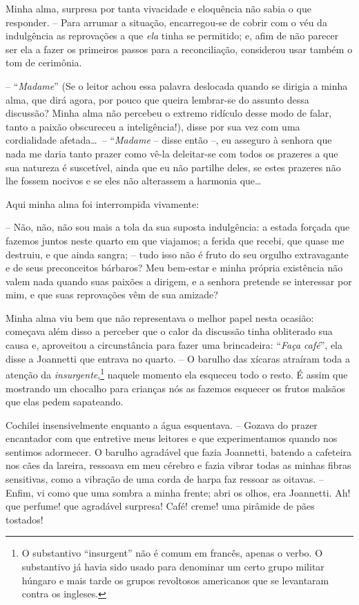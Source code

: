  Minha alma, surpresa por tanta vivacidade e eloquência não sabia o que
responder. -- Para arrumar a situação, encarregou-se de cobrir com o
véu da indulgência as reprovações a que \textit{ela} tinha se
permitido; e, afim de não parecer ser ela a fazer os primeiros passos
para a reconciliação, considerou usar também o tom de cerimônia.

 -- ``\textit{Madame}'' (Se o leitor achou essa palavra deslocada quando
se dirigia a minha alma, que dirá agora, por pouco que queira
lembrar-se do assunto dessa discussão? Minha alma não percebeu o
extremo ridículo desse modo de falar, tanto a paixão obscureceu a
inteligência!), disse por sua vez com uma cordialidade afetada\ldots\ --
``\textit{Madame} -- disse então --, eu asseguro à senhora que nada me daria
tanto prazer como vê-la deleitar-se com todos os prazeres a que sua
natureza é suscetível, ainda que eu não partilhe deles, se estes
prazeres não lhe fossem nocivos e se eles não alterassem a harmonia que\ldots

Aqui minha alma foi interrompida vivamente: 

-- Não, não, não sou mais a tola da sua suposta indulgência: a estada
forçada que fazemos juntos neste quarto em que viajamos; a ferida que
recebi, que quase me destruiu, e que ainda sangra; -- tudo isso não é
fruto do seu orgulho extravagante e de seus preconceitos bárbaros? Meu
bem-estar e minha própria existência não valem nada quando suas paixões
a dirigem, e a senhora pretende se interessar por mim, e que suas
reprovações vêm de sua amizade?

 Minha alma viu bem que não representava o melhor papel nesta
ocasião:  começava além disso a perceber que o calor da discussão tinha
obliterado sua causa e, aproveitou a circunstância para fazer uma
brincadeira: ``\textit{Faça café}'', ela disse a Joannetti que entrava no
quarto. -- O barulho das xícaras atraíram toda a atenção da
\textit{insurgente},\footnote{ O substantivo ``insurgent'' não é comum em
francês, apenas o verbo. O substantivo já havia sido usado para
denominar um certo grupo militar húngaro e mais tarde os grupos
revoltosos americanos que se levantaram contra os \mbox{ingleses.}} 
naquele momento ela esqueceu todo o resto. É assim que mostrando um
chocalho para crianças nós as fazemos esquecer os frutos malsãos que
elas pedem sapateando.

 Cochilei insensivelmente enquanto a água esquentava. -- Gozava do
prazer encantador com que entretive meus leitores e que experimentamos
quando nos sentimos adormecer. O barulho agradável que fazia Joannetti,
batendo a cafeteira nos cães da lareira, ressoava em meu cérebro e
fazia vibrar todas as minhas fibras sensitivas, como a vibração de uma
corda de harpa faz ressoar as oitavas. -- Enfim, vi como que uma
sombra a minha frente; abri os olhos, era Joannetti. Ah! que perfume!
que agradável surpresa! Café! creme! uma pirâmide de pães tostados!

